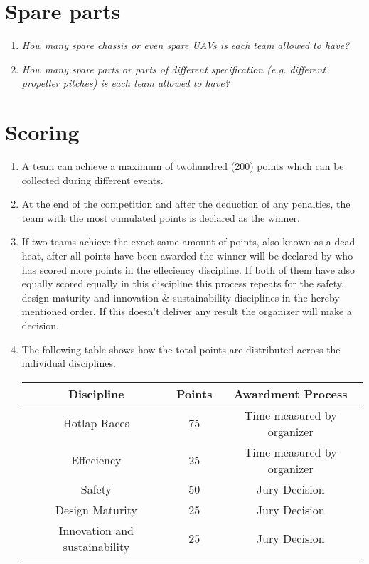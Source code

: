     \section{Spare parts}
    \begin{enumerate}
      \item \emph{How many spare chassis or even spare UAVs is each team allowed to have?}
      \item \emph{How many spare parts or parts of different specification (e.g. different propeller pitches) is each team allowed to have?}
    \end{enumerate}

    \section{Scoring}
    \begin{enumerate}
      \item A team can achieve a maximum of twohundred (200) points which can be collected during different events.
      \item At the end of the competition and after the deduction of any penalties, the team with the most cumulated points is declared as the winner. 
      \item If two teams achieve the exact same amount of points, also known as a dead heat, after all points have been awarded the winner will be declared by who has scored more points in the effeciency discipline. 
      If both of them have also equally scored equally in this discipline this process repeats for the safety, design maturity and innovation \& sustainability disciplines in the hereby mentioned order. If this doesn't deliver any result the organizer will make a decision. 
      \item The following table shows how the total points are distributed across the individual disciplines. 

      \begin{center}
        \begin{tabular}{|c|c|c|} 
          \hline
          Discipline & Points & Awardment Process \\ 
          \hline
          Hotlap Races & 75 & Time measured by organizer \\ 
          \hline
          Effeciency & 25 & Time measured by organizer \\ 
          \hline
          Safety & 50 & Jury Decision \\ 
          \hline
          Design Maturity & 25 & Jury Decision \\ 
          \hline
          Innovation and sustainability & 25 & Jury Decision \\ 
          \hline
        \end{tabular}
      \end{center}


    \end{enumerate}

